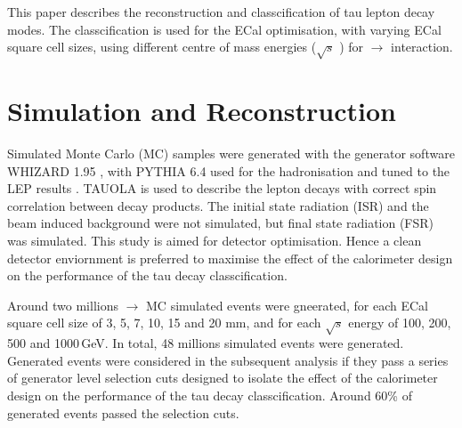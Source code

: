 \documentclass[a4paper,11pt]{article}
\newcommand{\eeToTauTau}{\Pem\Pep $\to$ \PGtm\PGtp}
\newcommand{\rootS}{\ensuremath{\sqrt{s}} }
\begin{document}

This paper describes the reconstruction and classcification of tau lepton decay modes. The classcification is used for the ECal optimisation, with varying ECal square cell sizes, using different centre of mass energies (\rootS) for \eeToTauTau interaction.


\section{Simulation and Reconstruction}
\label{section:MC}
Simulated Monte Carlo (MC) samples were generated with the generator software WHIZARD 1.95 \cite{whizard}, with PYTHIA 6.4 \cite{Sjostrand:1995iq}  used for the hadronisation and  tuned to the LEP results \cite{}. TAUOLA \cite{Jadach:1993hs} is used to describe the \PGt lepton decays with correct spin correlation between decay products. The initial state radiation (ISR) and the beam induced background were not simulated, but final state radiation (FSR) was simulated. This study is aimed for detector optimisation. Hence a clean detector enviornment is preferred to maximise the effect of the calorimeter design on the performance of the tau decay classcification.

Around two millions \eeToTauTau MC simulated events were gneerated, for each ECal square cell size of 3, 5, 7, 10, 15 and 20 mm, and for each \rootS energy of 100, 200, 500 and 1000\,GeV. In total, 48 millions simulated events were generated. Generated events were considered in the subsequent analysis if they pass a series of generator level selection cuts designed to isolate the effect of the calorimeter design on the performance of the tau decay classcification. Around 60\% of generated events passed the selection cuts.
\end{document}
